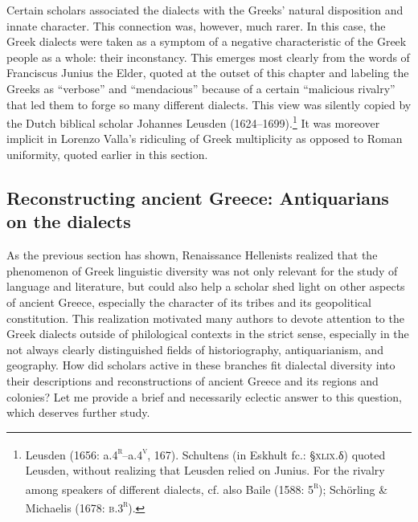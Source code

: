 Certain scholars associated the dialects with the Greeks’ natural disposition and innate character. This connection was, however, much rarer. In this case, the Greek dialects were taken as a symptom of a negative characteristic of the Greek people as a whole: their inconstancy. This emerges most clearly from the words of Franciscus Junius the Elder, quoted at the outset of this chapter and labeling the Greeks as “verbose” and “mendacious” because of a certain “malicious rivalry” that led them to forge so many different dialects. This view was silently copied by the Dutch biblical scholar Johannes Leusden (1624–1699).\footnote{Leusden (1656: a.4\textsc{\textsuperscript{r}}\textsc{–}a.4\textsc{\textsuperscript{v}}, 167). Schultens (in Eskhult fc.: §\textsc{xlix.}δ) quoted Leusden, without realizing that Leusden relied on Junius. For the rivalry among speakers of different dialects, cf. also Baile (1588: 5\textsc{\textsuperscript{r}}); Schörling \& Michaelis (1678: \textsc{b.3}\textsc{\textsuperscript{r}}).} It was moreover implicit in Lorenzo Valla’s ridiculing of Greek multiplicity as opposed to Roman uniformity, quoted earlier in this section.

\subsection{Reconstructing ancient Greece: Antiquarians on the dialects}
\hypertarget{Toc19704855}{}
As the previous section has shown, Renaissance Hellenists realized that the phenomenon of Greek linguistic diversity was not only relevant for the study of language and literature, but could also help a scholar shed light on other aspects of ancient Greece, especially the character of its tribes and its geopolitical constitution. This realization motivated many authors to devote attention to the Greek dialects outside of philological contexts in the strict sense, especially in the not always clearly distinguished fields of historiography, antiquarianism, and geography. How did scholars active in these branches fit dialectal diversity into their descriptions and reconstructions of ancient Greece and its regions and colonies? Let me provide a brief and necessarily eclectic answer to this question, which deserves further study.

